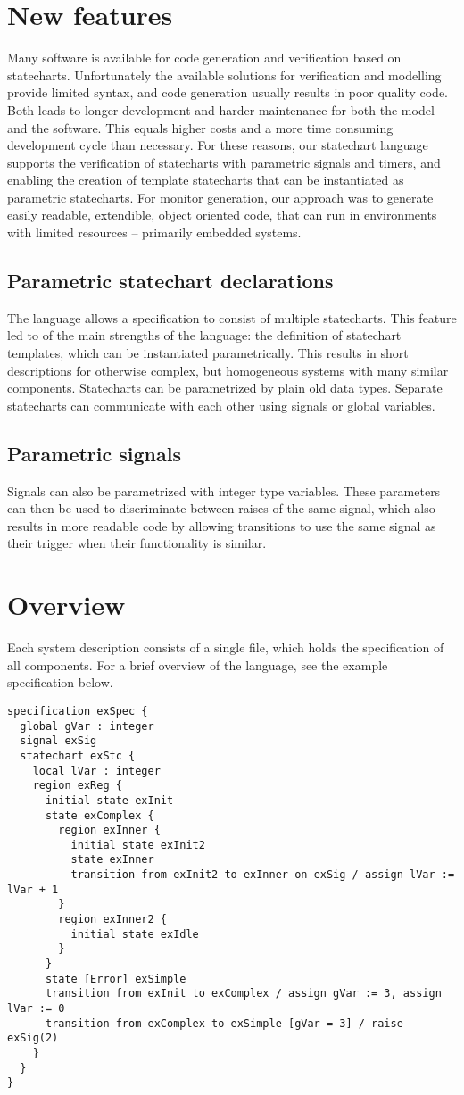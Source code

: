 \section{New features}
Many software is available for code generation and verification based on statecharts. Unfortunately the available solutions for verification and modelling provide limited syntax, and code generation usually results in poor quality code. Both leads to longer development and harder maintenance for both the model and the software. This equals higher costs and a more time consuming development cycle than necessary. For these reasons, our statechart language supports the verification of statecharts with parametric signals and timers, and enabling the creation of template statecharts that can be instantiated as parametric statecharts. For monitor generation, our approach was to generate easily readable, extendible, object oriented code, that can run in environments with limited resources -- primarily embedded systems.
  \subsection{Parametric statechart declarations}
The language allows a specification to consist of multiple statecharts. This feature led to of the main strengths of the language: the definition of statechart templates, which can be instantiated parametrically. This results in short descriptions for otherwise complex, but homogeneous systems with many similar components. Statecharts can be parametrized by plain old data types. Separate statecharts can communicate with each other using signals or global variables.
  \subsection{Parametric signals}
Signals can also be parametrized with integer type variables. These parameters can then be used to discriminate between raises of the same signal, which also results in more readable code by allowing transitions to use the same signal as their trigger when their functionality is similar.
\section{Overview}
Each system description consists of a single file, which holds the specification of all components. For a brief overview of the language, see the example specification below.
\begin{verbatim}
specification exSpec {
  global gVar : integer
  signal exSig
  statechart exStc {
    local lVar : integer
    region exReg {
      initial state exInit
      state exComplex {
        region exInner {
          initial state exInit2
          state exInner
          transition from exInit2 to exInner on exSig / assign lVar := lVar + 1
        }
        region exInner2 {
          initial state exIdle
        }
      }
      state [Error] exSimple
      transition from exInit to exComplex / assign gVar := 3, assign lVar := 0
      transition from exComplex to exSimple [gVar = 3] / raise exSig(2)
    }
  }
}
\end{verbatim}
